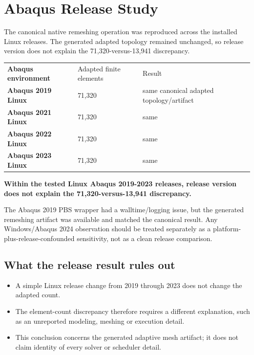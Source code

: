 \documentclass[10pt,a4paper]{article}
\newcommand{\rowcolor}[1]{}
\newcommand{\headrow}{\color{navy}\bfseries}
\begin{document}
\section{Abaqus Release Study}
The canonical native remeshing operation was reproduced across the installed Linux releases. The generated adapted topology remained unchanged, so release version does not explain the 71,320-versus-13,941 discrepancy.
\small
\par\smallskip\noindent
\begin{tabularx}{\textwidth}{>{\bfseries}p{45mm}p{38mm}Y}
\headrow Abaqus environment & Adapted finite elements & Result\\
Abaqus 2019 Linux & 71,320 & same canonical adapted topology/artifact\\
\rowcolor{paleblue}Abaqus 2021 Linux & 71,320 & same\\
Abaqus 2022 Linux & 71,320 & same\\
\rowcolor{paleblue}Abaqus 2023 Linux & 71,320 & same\\
\end{tabularx}\par\smallskip
\normalsize

\textbf{Within the tested Linux Abaqus 2019-2023 releases, release version does not explain the 71,320-versus-13,941 discrepancy.}

The Abaqus 2019 PBS wrapper had a walltime/logging issue, but the generated remeshing artifact was available and matched the canonical result. Any Windows/Abaqus 2024 observation should be treated separately as a platform-plus-release-confounded sensitivity, not as a clean release comparison.

\subsection{What the release result rules out}
\begin{itemize}
\item A simple Linux release change from 2019 through 2023 does not change the adapted count.
\item The element-count discrepancy therefore requires a different explanation, such as an unreported modeling, meshing or execution detail.
\item This conclusion concerns the generated adaptive mesh artifact; it does not claim identity of every solver or scheduler detail.
\end{itemize}

\newpage
\end{document}

